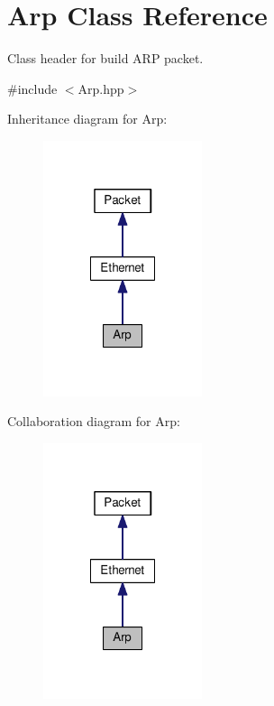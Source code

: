 \hypertarget{class_arp}{\section{Arp Class Reference}
\label{class_arp}
}


Class header for build A\-R\-P packet.  




{\ttfamily \#include $<$Arp.\-hpp$>$}



Inheritance diagram for Arp\-:\nopagebreak
\begin{figure}[H]
\begin{center}
\leavevmode
\includegraphics[width=132pt]{class_arp__inherit__graph}
\end{center}
\end{figure}


Collaboration diagram for Arp\-:\nopagebreak
\begin{figure}[H]
\begin{center}
\leavevmode
\includegraphics[width=132pt]{class_arp__coll__graph}
\end{center}
\end{figure}
